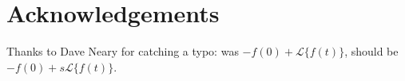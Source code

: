 \documentclass{article}
\theoremstyle{definition}
\begin{document}
\bigskip
\section*{Acknowledgements}
Thanks to Dave Neary for catching a typo: was $-f(0) + \mathcal{L}\{f(t)\}$, should be $-f(0) + s \mathcal{L}\{f(t)\} $.

\newpage


\end{document}
